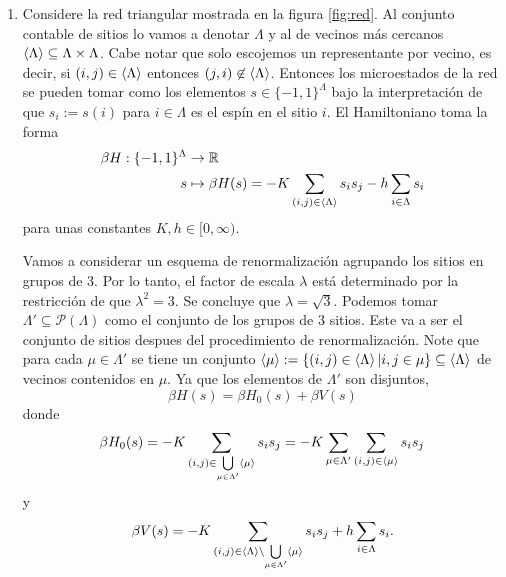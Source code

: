 \documentclass{article}
\begin{document}
\begin{enumerate}

\item Considere la red triangular mostrada en la figura \ref{fig:red}. Al conjunto contable de sitios lo vamos a denotar $\Lambda$ y al de vecinos más cercanos $\ev{\Lambda}\subseteq\Lambda\times\Lambda$. Cabe notar que solo escojemos un representante por vecino, es decir, si $(i,j)\in\ev{\Lambda}$ entonces $(j,i)\not\in\ev{\Lambda}$. Entonces los microestados de la red se pueden tomar como los elementos $s\in\{-1,1\}^\Lambda$ bajo la interpretación de que $s_i:=s(i)$ para $i\in\Lambda$ es el espín en el sitio $i$. El Hamiltoniano toma la forma
\begin{align}
\begin{split}
\beta H:\{-1,1\}^\Lambda&\rightarrow \mathbb{R}\\
s&\mapsto \beta H(s)=-K\sum_{(i,j)\in\ev{\Lambda}}s_is_j-h\sum_{i\in\Lambda}s_i
\end{split}
\end{align} 
para unas constantes $K,h\in[0,\infty)$.

Vamos a considerar un esquema de renormalización agrupando los sitios en grupos de 3. Por lo tanto, el factor de escala $\lambda$ está determinado por la restricción de que $\lambda^2=3$. Se concluye que $\lambda=\sqrt{3}$. Podemos tomar $\Lambda'\subseteq \mathcal{P}(\Lambda)$ como el conjunto de los grupos de 3 sitios. Este va a ser el conjunto de sitios despues del procedimiento de renormalización. Note que para cada $\mu\in\Lambda'$ se tiene un conjunto $\ev{\mu}:=\{(i,j)\in\ev{\Lambda}|i,j\in\mu\}\subseteq\ev{\Lambda}$ de vecinos contenidos en $\mu$. Ya que los elementos de $\Lambda'$ son disjuntos,
\begin{equation}
\beta H(s)=\beta H_0(s)+\beta V(s)
\end{equation}
donde
\begin{equation}
\beta H_0(s)=-K\sum_{(i,j)\in\bigcup\limits_{\mu\in\Lambda'}\ev{\mu}}s_is_j=-K\sum_{\mu\in\Lambda'}\sum_{(i,j)\in\ev{\mu}}s_is_j
\end{equation}
y
\begin{equation}
\beta V(s)=-K\sum_{(i,j)\in\ev{\Lambda}\setminus\bigcup\limits_{\mu\in\Lambda'}\ev{\mu}}s_is_j+h\sum_{i\in\Lambda}s_i.
\end{equation}


\end{enumerate}
\end{document}
